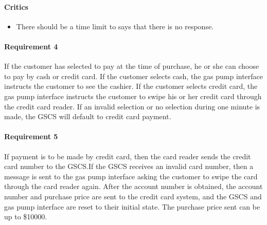 \documentclass[11pt, a4paper]{article}
\begin{document}
\begin{framed}
    \paragraph{Critics} 
    \begin{itemize}
        \item There should be a time limit to says that there is no
            response.
    \end{itemize}

    \paragraph{Requirement 4} If the customer has selected to pay at the time of
    purchase, he or she can choose to pay by cash or credit card. If the
    customer selects cash, the gas pump interface instructs the customer to see
    the cashier. If the customer selects credit card, the gas pump interface
    instructs the customer to swipe his or her credit card through the credit
    card reader. If an invalid selection or no selection during one
    minute is made, the GSCS will default to credit card payment.
\end{framed}

\paragraph{Requirement 5} If payment is to be made by credit card, then the
card reader sends the credit card number to the GSCS.\@ If the GSCS receives
an invalid card number, then a message is sent to the gas pump interface
asking the customer to swipe the card through the card reader again. After
the account number is obtained, the account number and purchase price are
sent to the credit card system, and the GSCS and gas pump interface are
reset to their initial state. The purchase price sent can be up
to \${}10000.
\end{document}
